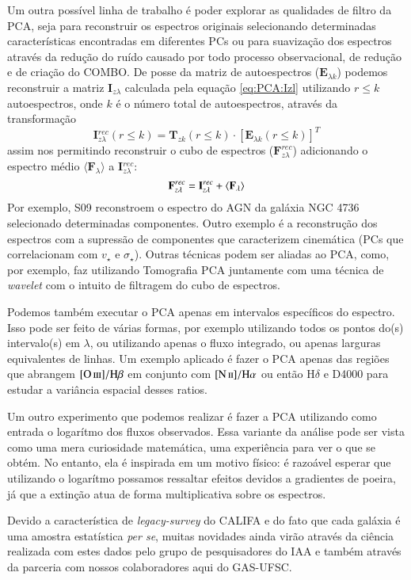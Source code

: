 Um outra possível linha de trabalho é poder explorar as qualidades de filtro da PCA, seja para reconstruir os espectros
originais selecionando determinadas características encontradas em diferentes PCs ou para suavização dos espectros
através da redução do ruído causado por todo processo observacional, de redução e de criação do COMBO. De posse da
matriz de autoespectros ($\mathbf{E}_{\lambda k}$) podemos reconstruir a matriz $\mathbf{I}_{z \lambda}$  calculada pela
equação \ref{eq:PCA:Izl} utilizando $r \leq k$ autoespectros, onde $k$ é o número total de autoespectros, através da
transformação
\begin{equation}
	\mathbf{I}{}_{z \lambda}^{rec}(r \leq k) = \mathbf{T}{}_{z k}(r \leq k) \cdot [\mathbf{E}{}_{\lambda k}(r \leq k)]^T
\end{equation}
\noindent assim nos permitindo reconstruir o cubo de espectros ($\mathbf{F}_{z \lambda}^{rec}$) adicionando o
espectro médio $\langle \mathbf{F}{}_\lambda \rangle$ a $\mathbf{I}{}_{z \lambda}^{rec}$:
\begin{equation}
	\mathbf{F}{}_{z \lambda}^{rec} = \mathbf{I}{}_{z \lambda}^{rec} + \mean{\mathbf{F}_\lambda}
\end{equation}
 \noindent Por exemplo, S09 reconstroem o espectro do AGN da galáxia NGC 4736 selecionado determinadas componentes.
 Outro exemplo é a reconstrução dos espectros com a supressão de componentes que caracterizem cinemática (PCs que
 correlacionam com $v_\star$ e $\sigma_\star$). Outras técnicas podem ser aliadas ao PCA, como, por exemplo, faz
 \citet{Riffel2011} utilizando Tomografia PCA juntamente com uma técnica de {\em wavelet} com o intuito de filtragem do
 cubo de espectros.

Podemos também executar o PCA apenas em intervalos específicos do espectro. Isso pode ser feito de várias formas, por
exemplo utilizando todos os pontos do(s) intervalo(s) em $\lambda$, ou utilizando apenas o fluxo integrado, ou apenas
larguras equivalentes de linhas. Um exemplo aplicado é fazer o PCA apenas das regiões que abrangem $\oIII/\Hbeta$ em
conjunto com $\nII/\Halpha$ ou então $\mathrm{H}\delta$ e D4000 para estudar a variância espacial desses ratios.

Um outro experimento que podemos realizar é fazer a PCA utilizando como entrada o logarítmo dos fluxos observados. Essa
variante da análise pode ser vista como uma mera curiosidade matemática, uma experiência para ver o que se obtém. No
entanto, ela é inspirada em um motivo físico: é razoável esperar que utilizando o logarítmo possamos ressaltar efeitos
devidos a gradientes de poeira, já que a extinção atua de forma multiplicativa sobre os espectros.

Devido a característica de {\em legacy-survey} do CALIFA e do fato que cada galáxia é uma amostra estatística
{\em per se}, muitas novidades ainda virão através da ciência realizada com estes dados pelo grupo de pesquisadores do
IAA e também através da parceria com nossos colaboradores aqui do GAS-UFSC.

